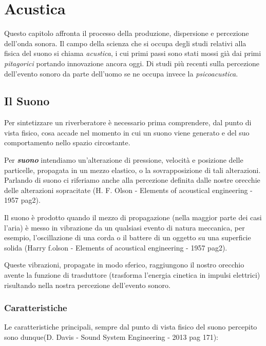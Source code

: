 
\chapter{Acustica}
\label{chp:Acustica}

Questo capitolo affronta il processo della produzione, dispersione e percezione dell'onda sonora. Il campo della scienza che si occupa degli studi relativi alla fisica del suono si chiama \emph{acustica}, i cui primi passi sono stati mossi già dai primi \textit{pitagorici} portando innovazione ancora oggi. Di studi più recenti sulla percezione dell'evento sonoro da parte dell'uomo se ne occupa invece la \textit{psicoacustica}.  

\section{Il Suono}

Per sintetizzare un riverberatore è necessario prima comprendere, dal punto di vista fisico, cosa accade nel momento in cui un suono viene generato e del suo comportamento nello spazio circostante.

Per \textbf{\textit{suono}} intendiamo un'alterazione di pressione, velocità e posizione delle particelle, propagata in un mezzo elastico, o la sovrapposizione di tali alterazioni.
Parlando di suono ci riferiamo anche alla percezione definita dalle nostre orecchie delle alterazioni sopracitate (H. F. Olson - Elements of acoustical engineering - 1957 pag2).

Il suono è prodotto quando il mezzo di propagazione (nella maggior parte dei casi l'aria)
è messo in vibrazione da un qualsiasi evento di natura meccanica, per esempio, l'oscillazione di una corda o il battere di un oggetto su una superficie solida  (Harry f.olson - Elements of acoustical engineering - 1957 pag2).

Queste vibrazioni, propagate in modo sferico, raggiungono il nostro orecchio avente la funzione di trasduttore (trasforma l'energia cinetica in impulsi elettrici) risultando nella nostra percezione dell'evento sonoro.

\subsection{Caratteristiche}
Le caratteristiche principali, sempre dal punto di vista fisico del suono percepito sono dunque(D. Davis - Sound System Engineering - 2013 pag 171):

